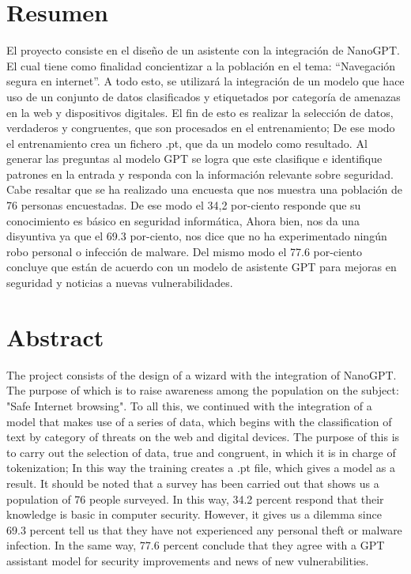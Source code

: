 \documentclass[12pt,letterpaper,fleqn]{report}
\begin{document}
\chapter*{Resumen}
El proyecto consiste en el diseño de un asistente con la integración de NanoGPT.
El cual tiene como finalidad concientizar a la población en el tema: “Navegación segura en internet”. 
A todo esto, se utilizará la integración de un modelo que hace uso de un conjunto de datos clasificados y etiquetados por categoría de amenazas en la web y dispositivos digitales. El fin de esto es realizar la selección de datos, verdaderos y congruentes, que son procesados en el entrenamiento; De ese modo el entrenamiento crea un fichero .pt, que da un modelo como resultado. Al generar las preguntas al modelo GPT se logra que este clasifique e identifique patrones en la entrada y responda con la información relevante sobre seguridad. 
Cabe resaltar que se ha realizado una encuesta que nos muestra una población de 76 personas encuestadas. De ese modo el 34,2 por-ciento responde que su conocimiento es básico en seguridad informática, Ahora bien, nos da una disyuntiva ya que el 69.3 por-ciento, nos dice que no ha experimentado ningún robo personal o infección de malware. Del mismo modo el 77.6 por-ciento concluye que están de acuerdo con un modelo de asistente GPT para mejoras en seguridad y noticias a nuevas vulnerabilidades.

 \cleardoublepage
\chapter*{Abstract}
 The project consists of the design of a wizard with the integration of NanoGPT.
The purpose of which is to raise awareness among the population on the subject: "Safe Internet browsing".
To all this, we continued with the integration of a model that makes use of a series of data, which begins with the classification of text by category of threats on the web and digital devices. The purpose of this is to carry out the selection of data, true and congruent, in which it is in charge of tokenization; In this way the training creates a .pt file, which gives a model as a result. It should be noted that a survey has been carried out that shows us a population of 76 people surveyed. In this way, 34.2 percent respond that their knowledge is basic in computer security. However, it gives us a dilemma since 69.3 percent tell us that they have not experienced any personal theft or malware infection. In the same way, 77.6 percent conclude that they agree with a GPT assistant model for security improvements and news of new vulnerabilities.
\end{document}

